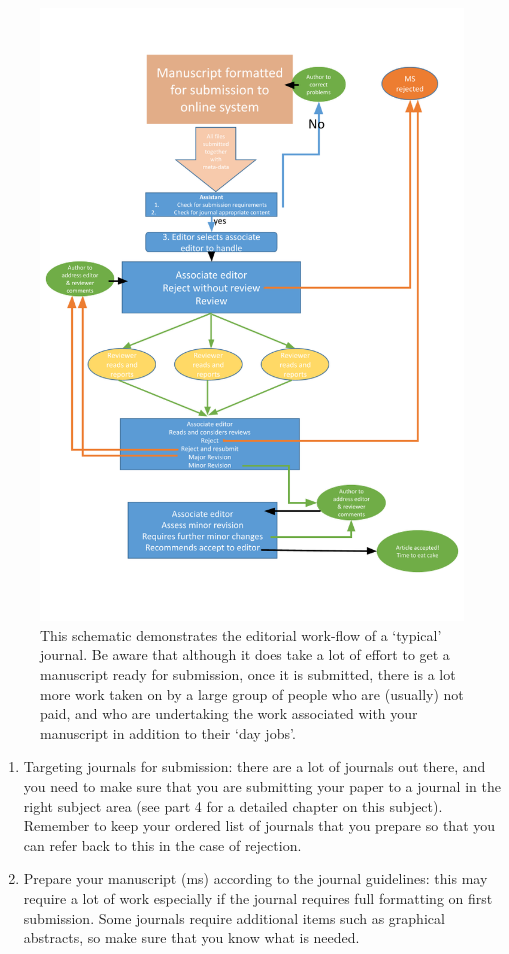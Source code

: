 \documentclass[
]{krantz}
\providecommand{\tightlist}{%
  \setlength{\itemsep}{0pt}\setlength{\parskip}{0pt}}
\begin{document}
\begin{figure}
\includegraphics[width=10in]{figures/Editorial-work-flow} \caption{This schematic demonstrates the editorial work-flow of a `typical' journal. Be aware that although it does take a lot of effort to get a manuscript ready for submission, once it is submitted, there is a lot more work taken on by a large group of people who are (usually) not paid, and who are undertaking the work associated with your manuscript in addition to their `day jobs'.}\label{fig:Editorial-work-flow}
\end{figure}

\begin{enumerate}
\def\labelenumi{\arabic{enumi}.}
\tightlist
\item
  Targeting journals for submission: there are a lot of journals out there, and you need to make sure that you are submitting your paper to a journal in the right subject area (see part 4 for a detailed chapter on this subject). Remember to keep your ordered list of journals that you prepare so that you can refer back to this in the case of rejection.
\item
  Prepare your manuscript (ms) according to the journal guidelines: this may require a lot of work especially if the journal requires full formatting on first submission. Some journals require additional items such as graphical abstracts, so make sure that you know what is needed.
\end{enumerate}
\end{document}
